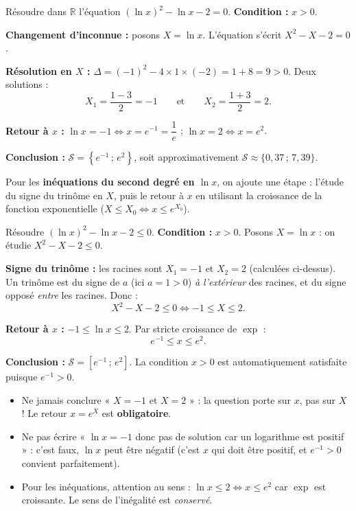 \documentclass[11pt]{article}
\newcommand{\cle}[1]{{\popxbold\color{popdark}#1}}
\begin{document}
\begin{exoresolu}
Résoudre dans $\mathbb{R}$ l'équation $(\ln x)^2 - \ln x - 2 = 0$.
\tcblower
\textbf{Condition :} $x > 0$.

\textbf{Changement d'inconnue :} posons $X = \ln x$. L'équation s'écrit $X^2 - X - 2 = 0$.

\textbf{Résolution en $X$ :} $\Delta = (-1)^2 - 4 \times 1 \times (-2) = 1 + 8 = 9 > 0$. Deux solutions :
\[ X_1 = \dfrac{1 - 3}{2} = -1 \qquad \text{et} \qquad X_2 = \dfrac{1 + 3}{2} = 2. \]

\textbf{Retour à $x$ :} $\ln x = -1 \iff x = e^{-1} = \dfrac{1}{e}$ ; $\ln x = 2 \iff x = e^{2}$.

\textbf{Conclusion :} $\mathcal{S} = \left\{e^{-1}\,;\,e^{2}\right\}$, soit approximativement $\mathcal{S} \approx \{0,37\,;\,7,39\}$.
\end{exoresolu}

Pour les \textbf{inéquations du second degré en $\ln x$}, on ajoute une étape : l'étude du \cle{signe du trinôme} en $X$, puis le retour à $x$ en utilisant la croissance de la fonction exponentielle ($X \leq X_0 \iff x \leq e^{X_0}$).

\begin{exoresolu}
Résoudre $(\ln x)^2 - \ln x - 2 \leq 0$.
\tcblower
\textbf{Condition :} $x > 0$. Posons $X = \ln x$ : on étudie $X^2 - X - 2 \leq 0$.

\textbf{Signe du trinôme :} les racines sont $X_1 = -1$ et $X_2 = 2$ (calculées ci-dessus). Un trinôme est du signe de $a$ (ici $a = 1 > 0$) \emph{à l'extérieur} des racines, et du signe opposé \emph{entre} les racines. Donc :
\[ X^2 - X - 2 \leq 0 \iff -1 \leq X \leq 2. \]

\textbf{Retour à $x$ :} $-1 \leq \ln x \leq 2$. Par stricte croissance de $\exp$ :
\[ e^{-1} \leq x \leq e^{2}. \]

\textbf{Conclusion :} $\mathcal{S} = \left[e^{-1}\,;\,e^{2}\right]$. La condition $x > 0$ est automatiquement satisfaite puisque $e^{-1} > 0$.
\end{exoresolu}

\begin{attention}
\begin{itemize}
\item Ne jamais conclure « $X = -1$ et $X = 2$ » : la question porte sur $x$, pas sur $X$ ! Le retour $x = e^{X}$ est \textbf{obligatoire}.
\item Ne pas écrire « $\ln x = -1$ donc pas de solution car un logarithme est positif » : c'est faux, $\ln x$ peut être négatif (c'est $x$ qui doit être positif, et $e^{-1} > 0$ convient parfaitement).
\item Pour les inéquations, attention au sens : $\ln x \leq 2 \iff x \leq e^{2}$ car $\exp$ est croissante. Le sens de l'inégalité est \emph{conservé}.
\end{itemize}
\end{attention}
\end{document}
